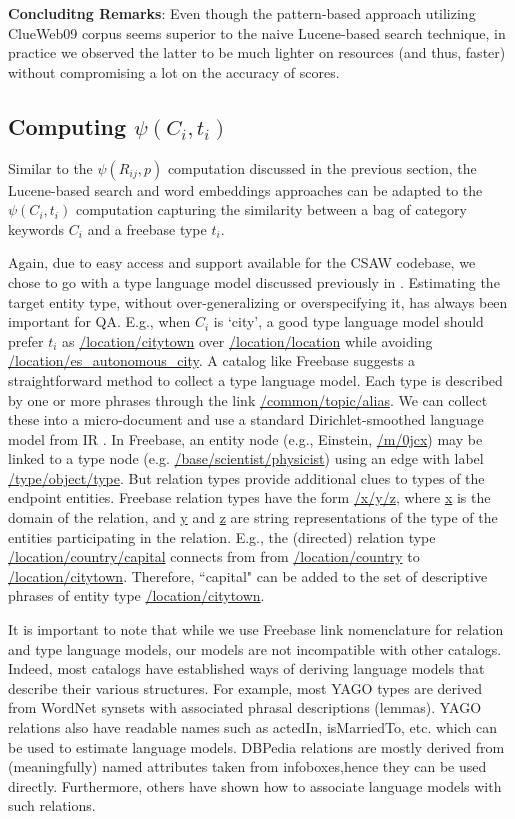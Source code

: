 \documentclass[a4paper, twoside, 12pt]{report}
\begin{document}
\textbf{Concluditng Remarks}: Even though the pattern-based approach utilizing ClueWeb09 corpus seems superior to the naive Lucene-based search technique, in practice we observed the latter to be much lighter on resources (and thus, faster) without compromising a lot on the accuracy of scores.

\subsection{Computing $\psi(C_i, t_i)$}
Similar to the $\psi(R_{ij},p)$ computation discussed in the previous section, the Lucene-based search and word embeddings approaches can be adapted to the $\psi(C_i, t_i)$ computation capturing the similarity between a bag of category keywords $C_i$ and a freebase type $t_i$.

Again, due to easy access and support available for the CSAW codebase, we chose to go with a type language model discussed previously in \cite{joshiknowledge}.
Estimating the target entity type, without over-generalizing or overspecifying it, has always been important for QA. E.g., when $C_i$ is `city', a good type language model should prefer $t_i$ as \url{/location/citytown} over \url{/location/location} while avoiding \url{/location/es_autonomous_city}.
A catalog like Freebase suggests a straightforward method to collect a type language model. Each type is described by one or more phrases through the link \url{/common/topic/alias}. We
can collect these into a micro-document and use a standard Dirichlet-smoothed language model from IR \cite{zhai2008statistical}. In Freebase, an entity node (e.g., Einstein, \url{/m/0jcx}) may be linked to a type node (e.g. \url{/base/scientist/physicist}) using an edge with label \url{/type/object/type}. But relation types provide additional clues to types of the endpoint entities. Freebase relation types have the form \url{/x/y/z}, where \url{x} is the domain of the relation, and \url{y} and \url{z} are string representations of the type of the entities participating in the relation. E.g., the (directed) relation
type \url{/location/country/capital} connects from from \url{/location/country} to \url{/location/citytown}. Therefore, ``capital" can be added to the set of descriptive phrases of entity type \url{/location/citytown}.

It is important to note that while we use Freebase link nomenclature for relation and type language models, our models are not incompatible with other catalogs. Indeed, most catalogs have established ways of deriving language models that describe their various structures. For example, most YAGO types are derived from WordNet synsets with associated phrasal descriptions (lemmas). YAGO relations also have readable names such as actedIn, isMarriedTo, etc. which can be used to estimate language models. DBPedia relations are mostly derived from (meaningfully) named attributes taken from infoboxes,hence they can be used directly. Furthermore, others \cite{wu2007autonomously} have shown how to associate language models with such relations.
\end{document}
